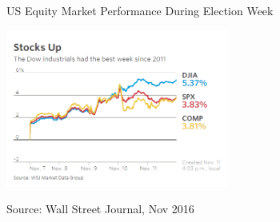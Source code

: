 \documentclass[11pt, a4paper]{article}
\begin{document}
\begin{figure}[h]
    \centering
 	\caption{US Equity Market Performance During Election Week}
    \includegraphics[width=0.65\textwidth]{ElectionDay}
    \label{fig:election}
	\caption*{Source: Wall Street Journal, Nov 2016}
\end{figure}
\end{document}
